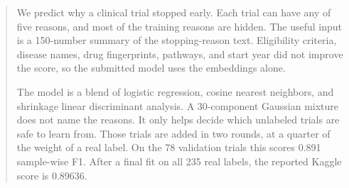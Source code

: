 \begin{abstract}
We predict why a clinical trial stopped early. Each trial can have any of five
reasons, and most of the training reasons are hidden. The useful input is a
150-number summary of the stopping-reason text. Eligibility criteria, disease
names, drug fingerprints, pathways, and start year did not improve the score, so
the submitted model uses the embeddings alone.

The model is a blend of logistic regression, cosine nearest neighbors, and
shrinkage linear discriminant analysis. A 30-component Gaussian mixture does not
name the reasons. It only helps decide which unlabeled trials are safe to learn
from. Those trials are added in two rounds, at a quarter of the weight of a real
label. On the 78 validation trials this scores 0.891 sample-wise F1. After a
final fit on all 235 real labels, the reported Kaggle score is 0.89636.
\end{abstract}
